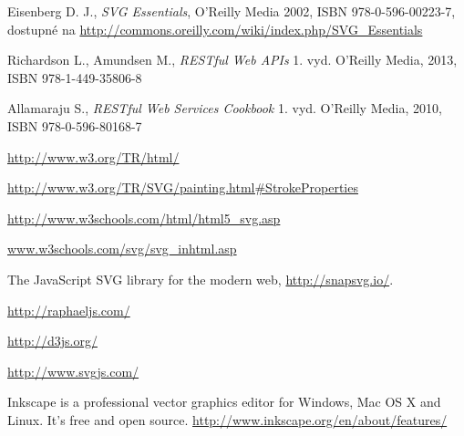 \begin{thebibliography}{99}
Eisenberg D. J., {\it SVG Essentials}, 
O'Reilly Media 2002, ISBN  978-0-596-00223-7,  dostupné na \url{http://commons.oreilly.com/wiki/index.php/SVG_Essentials}

Richardson L., Amundsen M., {\it RESTful Web APIs} 
1. vyd. O'Reilly Media, 2013, 
ISBN 978-1-449-35806-8

Allamaraju S., {\it RESTful Web Services Cookbook} 
1. vyd. O'Reilly Media, 2010, 
ISBN 978-0-596-80168-7





\url{http://www.w3.org/TR/html/}

\url{http://www.w3.org/TR/SVG/painting.html#StrokeProperties}

\url{ http://www.w3schools.com/html/html5_svg.asp}

\url{www.w3schools.com/svg/svg_inhtml.asp}


The JavaScript SVG library for the modern web,
\url{http://snapsvg.io/}.


\url{ http://raphaeljs.com/}

\url {http://d3js.org/}

 
 \url{http://www.svgjs.com/}


Inkscape is a professional vector graphics editor for Windows, Mac OS X and Linux. It's free and open source.
\url {http://www.inkscape.org/en/about/features/}

\end{thebibliography}
